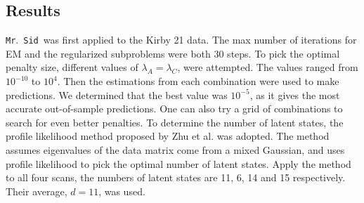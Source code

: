 \documentclass[fleqn,12pt]{article}
\newcommand{\mrsid}{{\sc \texttt{Mr}.~\texttt{Sid}}}
\begin{document}
%
%
%

\subsection{Results}

\mrsid~was first applied to the Kirby 21 data.
The max number of iterations for EM and the regularized subproblems were both 30 steps. To pick the optimal penalty size, different values of  $\lambda_A = \lambda_C$, were attempted. The values ranged from $10^{-10}$ to $10^{4}$. Then the estimations from each combination were used to make predictions. We determined that the best value was $10^{-5}$, as it gives the most accurate out-of-sample predictions. One can also try a grid of combinations to search for even better penalties. To determine the number of latent states, the profile likelihood method proposed by Zhu et al. \citep{zhu2006automatic} was adopted. The method assumes eigenvalues of the data matrix come from a mixed Gaussian, and uses profile likelihood to pick the optimal number of latent states. Apply the method to all four scans, the numbers of latent states are 11, 6, 14 and 15 respectively. Their average, $d=11$, was used.


%
%
%

%
%
%


%
%
%


%
%
%
\end{document}
